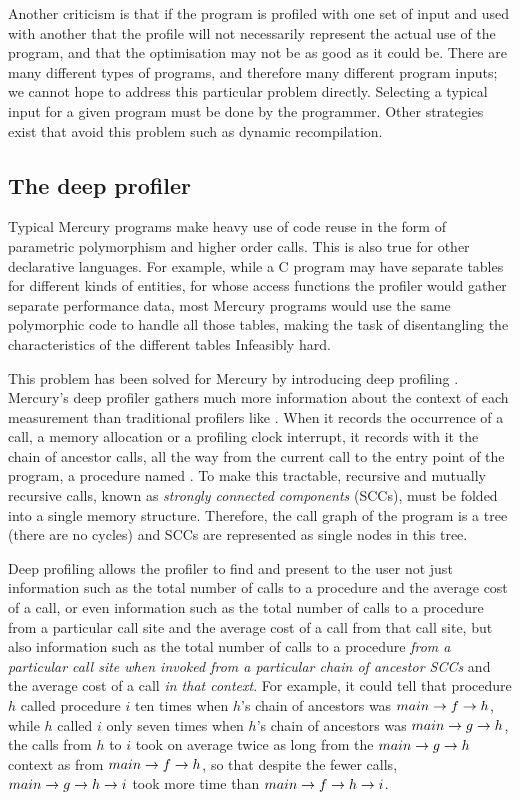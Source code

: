 Another criticism is that if the program is profiled with one set of input and
used with another that the profile will not necessarily represent the actual use
of the program,
and that the optimisation may not be as good as it could be.
There are many different types of programs, and therefore many different
program inputs;
we cannot hope to address this particular problem directly.
Selecting a typical input for a given program must be done by the programmer.
Other strategies exist that avoid this problem
such as dynamic recompilation.

\subsection{The deep profiler}

Typical Mercury programs make heavy use of code reuse in the form of
parametric polymorphism and higher order calls.
This is also true for other declarative languages.
For example, while a C program may have
separate tables for different kinds of entities,
for whose access functions
the profiler would gather separate performance data,
most Mercury programs would use
the same polymorphic code to handle all those tables,
making the task of disentangling the characteristics of the different tables
Infeasibly hard.

This problem has been solved for Mercury by introducing deep profiling
\citep{conway:2001:mercury-deep}.
Mercury's deep profiler gathers much more information about the context of
each measurement than traditional profilers like \cite{gprof}.
When it records the occurrence of a call,
a memory allocation or a profiling clock interrupt,
it records with it the chain of ancestor calls,
all the way from the current call to the entry point of the program,
a procedure named .
To make this tractable,
recursive and mutually recursive calls,
known as \emph{strongly connected components} (SCCs),
must be folded into a single memory structure.
Therefore, the call graph of the program is a tree (there are no cycles)
and SCCs are represented as single nodes in this tree.

Deep profiling allows the profiler to find and present to the user
not just information such as the total number of calls to a procedure
and the average cost of a call,
or even information such as the total number of calls to a procedure
from a particular call site and the average cost of a call from that call site,
but also information such as the total number of calls to a procedure
\emph{from a particular call site
when invoked from a particular chain of ancestor SCCs}
and the average cost of a call \emph{in that context}.
For example, it could tell that
procedure $h$ called procedure $i$ ten times
when $h$'s chain of ancestors was $main \rightarrow f \rightarrow h$,
while $h$ called $i$ only seven times
when $h$'s chain of ancestors was $main \rightarrow g \rightarrow h$,
the calls from $h$ to $i$ took on average twice as long
from the $main \rightarrow g \rightarrow h$ context as from $main \rightarrow f \rightarrow h$,
so that despite the fewer calls,
$main \rightarrow g \rightarrow h \rightarrow i$ took more time than $main \rightarrow f \rightarrow h \rightarrow i$.

